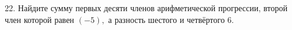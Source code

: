 22. Найдите сумму первых десяти членов арифметической прогрессии, второй член которой равен $(-5),$ а разность шестого и четвёртого $6.$\\
